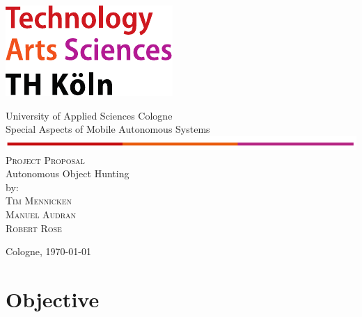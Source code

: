 \documentclass[a4paper,12pt,oneside]{article}
\renewcommand{\headrulewidth}{0pt}
\renewcommand{\footrulewidth}{0pt}}
\begin{document}
\pagestyle{empty}
\begin{titlepage}
	\includegraphics[scale=1.00]{sources/logo_TH-Koeln_CMYK_22pt-eps-converted-to.pdf}\\
	\begin{center}
		\large
		University of Applied Sciences Cologne\\
		Special Aspects of Mobile Autonomous Systems\\
		\includegraphics[scale=1.0]{sources/TH.PNG}\\
		\vspace{1cm}
		\textsc{Project Proposal}\\
		\vspace{2cm} %
		\LARGE
		Autonomous Object Hunting\\
		\vspace{3cm}
		\large
		\vspace{1.0cm}
		by:\\
		\textsc{Tim Mennicken}\\
		\textsc{Manuel Audran}\\
		\textsc{Robert Rose}
		\vspace{1cm}

		\vspace{5cm}
		Cologne, \today
	\end{center}    
\end{titlepage}

\newpage

\cleardoublepage
\pagestyle{fancy} %
\fancyhead{}
\fancyhf{}
\renewcommand{\headrulewidth}{0pt}
\renewcommand{\footrulewidth}{0.4pt}

\section*{Objective}
\end{document}
